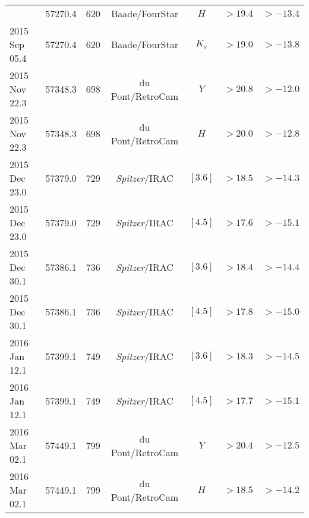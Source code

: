 \begin{tabular}{lcccccc}
{2015 Sep 05.4 & 57270.4 & 620 & Baade/FourStar & $H$ & $>19.4$ & $>-13.4$ \\
2015 Sep 05.4 & 57270.4 & 620 & Baade/FourStar & $K_s$ & $>19.0$ & $>-13.8$ \\
2015 Nov 22.3 & 57348.3 & 698 & du Pont/RetroCam & $Y$ & $>20.8$ & $>-12.0$ \\
2015 Nov 22.3 & 57348.3 & 698 & du Pont/RetroCam & $H$ & $>20.0$ & $>-12.8$ \\
2015 Dec 23.0 & 57379.0 & 729 & \textit{Spitzer}/IRAC & $[3.6]$ & $>18.5$ & $>-14.3$ \\
2015 Dec 23.0 & 57379.0 & 729 & \textit{Spitzer}/IRAC & $[4.5]$ & $>17.6$ & $>-15.1$ \\
2015 Dec 30.1 & 57386.1 & 736 & \textit{Spitzer}/IRAC & $[3.6]$ & $>18.4$ & $>-14.4$ \\
2015 Dec 30.1 & 57386.1 & 736 & \textit{Spitzer}/IRAC & $[4.5]$ & $>17.8$ & $>-15.0$ \\
2016 Jan 12.1 & 57399.1 & 749 & \textit{Spitzer}/IRAC & $[3.6]$ & $>18.3$ & $>-14.5$ \\
2016 Jan 12.1 & 57399.1 & 749 & \textit{Spitzer}/IRAC & $[4.5]$ & $>17.7$ & $>-15.1$ \\
2016 Mar 02.1 & 57449.1 & 799 & du Pont/RetroCam & $Y$ & $>20.4$ & $>-12.5$ \\
2016 Mar 02.1 & 57449.1 & 799 & du Pont/RetroCam & $H$ & $>18.5$ & $>-14.2$ \\
\end{tabular}